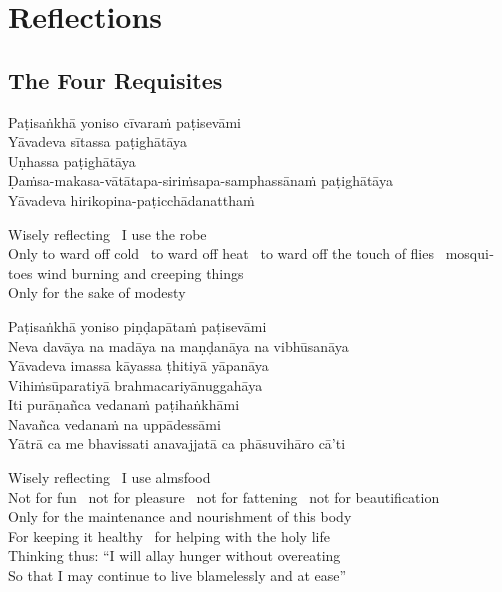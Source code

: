 
\chapter{Reflections}

\section{The Four Requisites}
\label{four-requisites}

\begin{leader}
\end{leader}

Paṭisaṅkhā yoniso cīvaraṁ paṭisevāmi\\
Yāvadeva sītassa paṭighātāya\\
Uṇhassa paṭighātāya\\
Ḍaṁsa-makasa-vātātapa-siriṁsapa-samphassānaṁ paṭighātāya\\
Yāvadeva hirikopina-paṭicchādanatthaṁ

\begin{english}
  Wisely reflecting \breathmark\ I use the robe\\
  Only to ward off cold \breathmark\ to ward off heat \breathmark\ to ward off the touch of flies \breathmark\ mosquitoes wind burning and creeping things\\
  Only for the sake of modesty
\end{english}

Paṭisaṅkhā yoniso piṇḍapātaṁ paṭisevāmi\\
Neva davāya na madāya na maṇḍanāya na vibhūsanāya\\
Yāvadeva imassa kāyassa ṭhitiyā yāpanāya\\
Vihiṁsūparatiyā brahmacariyānuggahāya\\
Iti purāṇañca vedanaṁ paṭihaṅkhāmi\\
Navañca vedanaṁ na uppādessāmi\\
Yātrā ca me bhavissati anavajjatā ca phāsuvihāro cā’ti

\begin{english}
  Wisely reflecting \breathmark\ I use almsfood\\
  Not for fun \breathmark\ not for pleasure \breathmark\ not for fattening \breathmark\ not for beautification\\
  Only for the maintenance and nourishment of this body\\
  For keeping it healthy \breathmark\ for helping with the holy life\\
  Thinking thus: “I will allay hunger without overeating\\
  So that I may continue to live blamelessly and at ease”
\end{english}

